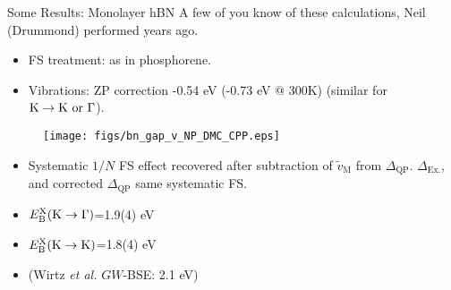 \documentclass[10pt, pdf, hyperref={draft}, usenames, dvipsnames]{beamer}
\begin{document}
\begin{frame}{Some Results: Monolayer hBN}
  A few of you know of these calculations, Neil (Drummond) performed years
  ago.
  \begin{itemize}
    \item FS treatment: as in phosphorene.

    \item Vibrations: ZP correction -0.54 eV (-0.73 eV @ 300K)
    (similar for ${\rm K} \rightarrow {\rm K}\ \text{or}\ \Gamma$).
  \end{itemize}

\begin{minipage}[t]{0.45\textwidth}

\begin{figure}[H]
  \centering
  \texttt{[image: figs/bn\_gap\_v\_NP\_DMC\_CPP.eps]}
\end{figure}
\end{minipage}%
\hfill
\begin{minipage}[t]{0.45\textwidth}

\begin{itemize}
  \item Systematic $1/N$ FS effect recovered after subtraction of ${\tilde
  v}_{\text{M}}$ from $\Delta_{\text{QP}}$. $\Delta_{\text{Ex.}}$, and
  corrected $\Delta_{\text{QP}}$ same systematic FS. %


  \item $E^{\rm X}_{\rm B}({\rm K} \rightarrow \Gamma)$=1.9(4) eV

  \item $E^{\rm X}_{\rm B}({\rm K} \rightarrow {\rm K})$=1.8(4) eV

  \item (Wirtz \textit{et al.} $GW$-BSE: 2.1 eV)

\end{itemize}

\end{minipage}%

\end{frame}
\end{document}
